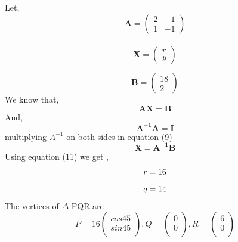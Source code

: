 \documentclass[10pt,a4paper]{article}
\let\vec\mathbf
\begin{document}
\begin{multicols}{2}
 Let,
\begin{equation}
\vec{A} =\begin{pmatrix}
2 & -1\\
1 &-1
\end{pmatrix} 
\end{equation} \\ \vspace{2mm}
\begin{equation}
  \vec{X} =\begin{pmatrix}
r \\
y
\end{pmatrix} 
\end{equation}  \vspace{2mm}

\begin{equation}
 \vec{B} = \begin{pmatrix}
18\\
2
\end{pmatrix} 
\end{equation} \vspace{2mm}
We know that,\\
\begin{equation}
\vec{A  X = B}
\end{equation}
And,\\
\begin{equation}
\vec{A^{-1} A = I}
\end{equation}
multiplying $A^{-1}$ on both sides in equation (9)\\
\begin{equation}
 \vec{X = A^{-1} B}
\end{equation}
Using equation (11) we get ,
\begin{equation}
r = 16 \vspace{2mm}
\end{equation}
\begin{equation}
 q = 14 \vspace{2mm}
\end{equation}
The vertices of $\Delta$ PQR are \\
\begin{equation}
P= 16 \begin{pmatrix}
cos 45\\
sin 45\\
\end{pmatrix} 
,Q= \begin{pmatrix}
 0\\
 0\\
 \end{pmatrix} 
,R= \begin{pmatrix}
 6\\
 0\\
\end{pmatrix} 
\end{equation} \vspace{2mm}



\end{multicols}
\end{document}
